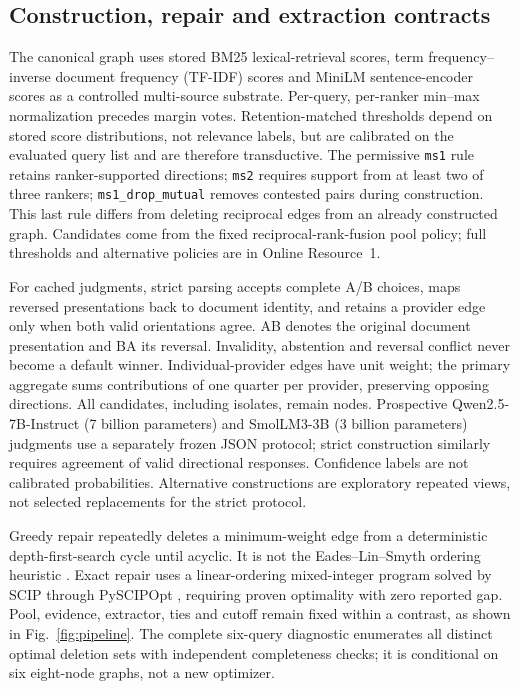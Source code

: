 \documentclass[pdflatex,iicol,sn-basic,Numbered]{sn-jnl}
\begin{document}
\subsection{Construction, repair and extraction contracts}
The canonical graph uses stored BM25 lexical-retrieval scores, term frequency--inverse document frequency (TF-IDF) scores and MiniLM sentence-encoder scores as a controlled multi-source substrate. Per-query, per-ranker min--max normalization precedes margin votes. Retention-matched thresholds depend on stored score distributions, not relevance labels, but are calibrated on the evaluated query list and are therefore transductive. The permissive \texttt{ms1} rule retains ranker-supported directions; \texttt{ms2} requires support from at least two of three rankers; \texttt{ms1\_drop\_mutual} removes contested pairs during construction. This last rule differs from deleting reciprocal edges from an already constructed graph. Candidates come from the fixed reciprocal-rank-fusion pool policy; full thresholds and alternative policies are in Online Resource~1.

For cached judgments, strict parsing accepts complete A/B choices, maps reversed presentations back to document identity, and retains a provider edge only when both valid orientations agree. AB denotes the original document presentation and BA its reversal. Invalidity, abstention and reversal conflict never become a default winner. Individual-provider edges have unit weight; the primary aggregate sums contributions of one quarter per provider, preserving opposing directions. All candidates, including isolates, remain nodes. Prospective Qwen2.5-7B-Instruct (7 billion parameters) and SmolLM3-3B (3 billion parameters) judgments use a separately frozen JSON protocol; strict construction similarly requires agreement of valid directional responses. Confidence labels are not calibrated probabilities. Alternative constructions are exploratory repeated views, not selected replacements for the strict protocol.

Greedy repair repeatedly deletes a minimum-weight edge from a deterministic depth-first-search cycle until acyclic. It is not the Eades--Lin--Smyth ordering heuristic \cite{eades1993heuristic}. Exact repair uses a linear-ordering mixed-integer program solved by SCIP through PySCIPOpt \cite{achterberg2009scip,maher2016pyscipopt}, requiring proven optimality with zero reported gap. Pool, evidence, extractor, ties and cutoff remain fixed within a contrast, as shown in Fig.~\ref{fig:pipeline}. The complete six-query diagnostic enumerates all distinct optimal deletion sets with independent completeness checks; it is conditional on six eight-node graphs, not a new optimizer.
\end{document}
